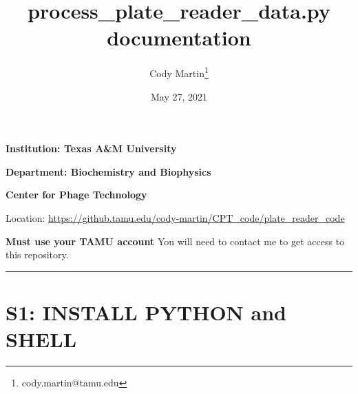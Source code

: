 \documentclass[12pt]{article}
\author{Cody Martin\thanks{cody.martin@tamu.edu}}
\date{May 27, 2021}
\title{process\_plate\_reader\_data.py documentation}
\begin{document}
\maketitle
\textbf{Institution: Texas A\&M University}

\textbf{Department: Biochemistry and Biophysics}

\textbf{Center for Phage Technology}

Location: \url{https://github.tamu.edu/cody-martin/CPT\_code/plate\_reader\_code}

\textbf{Must use your TAMU account} You will need to contact me to get access to this repository.

\noindent\rule{\textwidth}{0.5pt}

\section*{S1: INSTALL PYTHON and SHELL}
\label{sec:orgc716aa6}
\end{document}

